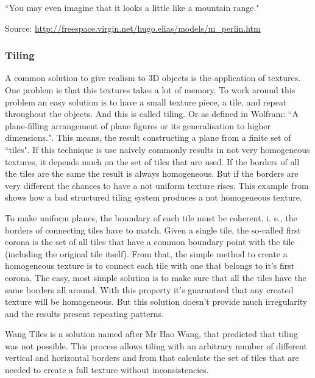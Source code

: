 ``You may even imagine that it looks a little like a mountain range."

Source: \url{http://freespace.virgin.net/hugo.elias/models/m_perlin.htm}





\subsubsection{Tiling} %
\label{ssub:tiling}

A common solution to give realism to 3D objects is the application of textures. One problem is that this textures takes a lot of memory. To work around this problem an easy solution is to have a small texture piece, a tile, and repeat throughout the objects. And this is called tiling. Or as defined in Wolfram: ``A plane-filling arrangement of plane figures or its generalisation to higher dimensions.".  This means, the result constructing a plane from a finite set of ``tiles". 
If this technique is use naively commonly results in not very homogeneous textures, it depends much on the set of tiles that are used. If the borders of all the tiles are the same the result is always homogeneous. But if the borders are very different the chances to have a not uniform texture rises. This example from \cite{ProcWorld} shows how a bad structured tiling system produces a not homogeneous texture.  





To make uniform planes, the boundary of each tile must be coherent, i. e., the borders of connecting tiles have to match. Given a single tile, the so-called first corona is the set of all tiles that have a common boundary point with the tile (including the original tile itself). From that, the simple method to create a homogeneous texture is to connect each tile with one that belongs to it's first corona.
The easy, most simple solution is to make sure that all the tiles have the same borders all around. With this property it's guaranteed that any created texture will be homogeneous. But this solution doesn't provide much irregularity and the results present repeating patterns. 


Wang Tiles is a solution named after Mr Hao Wang, that predicted that tiling was not possible. This process allows tiling with an arbitrary number of different vertical and horizontal borders and from that calculate the set of tiles that are needed to create a full texture without inconsistencies. 



